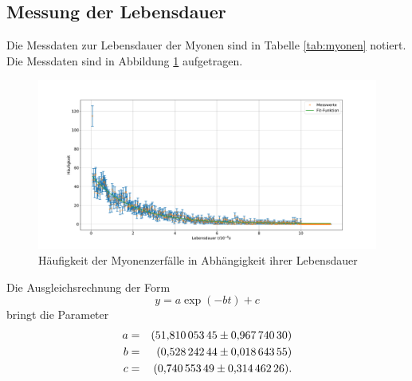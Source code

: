 \subsection{Messung der Lebensdauer}
Die Messdaten zur Lebensdauer der Myonen sind in Tabelle \ref{tab:myonen} notiert.
Die Messdaten sind in Abbildung \ref{fig:myonen} aufgetragen.
\begin{figure}[h!]
  \centering
  \includegraphics[width=\textwidth]{figmyonen.pdf}
  \caption{Häufigkeit der Myonenzerfälle in Abhängigkeit ihrer Lebensdauer}
  \label{fig:myonen}
\end{figure}
Die Ausgleichsrechnung der Form
\begin{equation*}
y = a \exp{(-b t)}+c
\end{equation*}
bringt die Parameter
\begin{align*}
a  &=&  \SI{51.81005345 \pm 0.9677403}{}\\
b  &=&  \SI{0.52824244 \pm 0.01864355}{}\\
c  &=&  \SI{0.74055349 \pm 0.31446226}{}.\\
\end{align*}

\FloatBarrier
